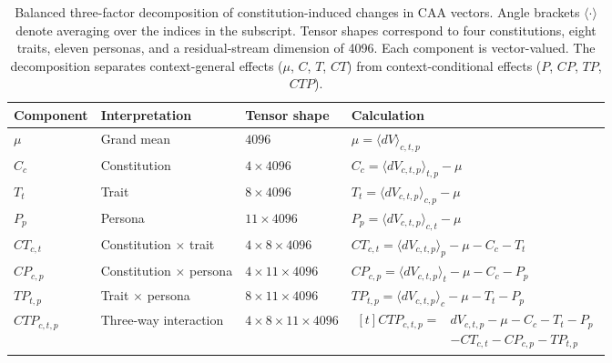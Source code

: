 \documentclass{article}
\begin{document}
\begin{table}[t]
\centering
\small
\setlength{\tabcolsep}{7pt}
\renewcommand{\arraystretch}{1.5}
\begin{tabular}{@{}lll l@{}}
\toprule
\textbf{Component} & \textbf{Interpretation}
& \textbf{Tensor shape} & \textbf{Calculation} \\
\midrule

$\mu$ & Grand mean
& $4096$
& $\displaystyle \mu = \langle dV \rangle_{c,t,p}$ \\

$C_c$ & Constitution
& $4 \times 4096$
& $\displaystyle C_c = \langle dV_{c,t,p} \rangle_{t,p} - \mu$ \\

$T_t$ & Trait
& $8 \times 4096$
& $\displaystyle T_t = \langle dV_{c,t,p} \rangle_{c,p} - \mu$ \\

$P_p$ & Persona
& $11 \times 4096$
& $\displaystyle P_p = \langle dV_{c,t,p} \rangle_{c,t} - \mu$ \\

$CT_{c,t}$ & Constitution $\times$ trait
& $4 \times 8 \times 4096$
& $\displaystyle CT_{c,t} =
  \langle dV_{c,t,p} \rangle_p - \mu - C_c - T_t$ \\

$CP_{c,p}$ & Constitution $\times$ persona
& $4 \times 11 \times 4096$
& $\displaystyle CP_{c,p} =
  \langle dV_{c,t,p} \rangle_t - \mu - C_c - P_p$ \\

$TP_{t,p}$ & Trait $\times$ persona
& $8 \times 11 \times 4096$
& $\displaystyle TP_{t,p} =
  \langle dV_{c,t,p} \rangle_c - \mu - T_t - P_p$ \\

$CTP_{c,t,p}$ & Three-way interaction
& $4 \times 8 \times 11 \times 4096$
& $\displaystyle
  \begin{aligned}[t]
  CTP_{c,t,p} ={}&
    dV_{c,t,p} - \mu - C_c - T_t - P_p\\
    &- CT_{c,t} - CP_{c,p} - TP_{t,p}
  \end{aligned}$ \\

\bottomrule
\end{tabular}

\caption{Balanced three-factor decomposition of
constitution-induced changes in CAA vectors.
Angle brackets $\langle \cdot \rangle$ denote averaging
over the indices in the subscript. Tensor shapes
correspond to four constitutions, eight traits,
eleven personas, and a residual-stream dimension
of 4096. Each component is vector-valued.
The decomposition separates context-general effects
($\mu$, $C$, $T$, $CT$) from context-conditional effects
($P$, $CP$, $TP$, $CTP$).}
\label{tab:anova_components}
\end{table}
\end{document}
